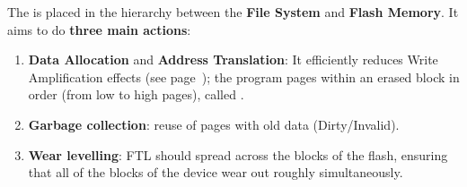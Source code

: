 \highspace
The  is placed in the hierarchy between the \textbf{File System} and \textbf{Flash Memory}. It aims to do \textbf{three main actions}:
\begin{enumerate}
    \item \textbf{Data Allocation} and \textbf{Address Translation}: It efficiently reduces Write Amplification effects (see page~\pageref{Write amplification (WA)}); the program pages within an erased block in order (from low to high pages), called .

    \item \textbf{Garbage collection}: reuse of pages with old data (Dirty/Invalid).

    \item \textbf{Wear levelling}: FTL should spread across the blocks of the flash, ensuring that all of the blocks of the device wear out roughly simultaneously.
\end{enumerate}

